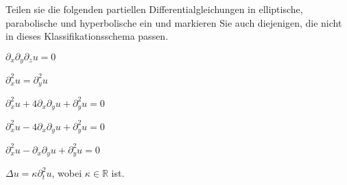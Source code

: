 Teilen sie die folgenden partiellen Differentialgleichungen
in elliptische, parabolische und hyperbolische ein und markieren
Sie auch diejenigen, die nicht in dieses Klassifikationsschema passen.
\begin{teilaufgaben}
\item $\partial_x\partial_y\partial_z u=0$
\item $\partial_x^2u=\partial_y^2u$
\item $\partial_x^2u+4\partial_x\partial_yu+\partial_y^2u=0$
\item $\partial_x^2u-4\partial_x\partial_yu+\partial_y^2u=0$
\item $\partial_x^2u-\partial_x\partial_yu+\partial_y^2u=0$
\item $\Delta u=\kappa\partial_t^2u$, wobei $\kappa\in \mathbb R$ ist.
\end{teilaufgaben}

